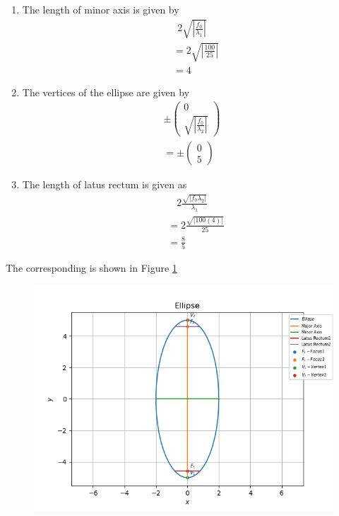 \documentclass[12pt]{article}
\providecommand{\brak}[1]{\ensuremath{\left(#1\right)}}
\providecommand{\abs}[1]{\left\vert#1\right\vert}
\newcommand{\myvec}[1]{\ensuremath{\begin{pmatrix}#1\end{pmatrix}}}
\begin{document}
\begin{enumerate}
\item The length of minor axis is given by
\begin{align}
	 2\sqrt{\abs{\frac{f_0}{\lambda_1}}}
\end{align}
\begin{align}
	&= 2\sqrt{\abs{\frac{100}{25}}}\\
	&= 4
\end{align}
\item The vertices of the ellipse are given by
\begin{align}
	 \pm \myvec{0\\\sqrt{\abs{\frac{f_0}{\lambda_2}}}}\\
	= \pm \myvec{0\\5}
\end{align}
\item The length of latus rectum is given as
\begin{align}
	 2\frac{\sqrt{\abs{f_0 \lambda_2}}}{\lambda_1}
\end{align}
\begin{align}
	&= 2\frac{\sqrt{\abs{100\brak{4}}}}{25}\\
	&= \frac{8}{5}
\end{align}
\end{enumerate}
The corresponding is shown in Figure \ref{fig:Fig1}
\begin{figure}[!h]
	\begin{center} 
	    \includegraphics[width=\columnwidth]{figs/ellipse}
	\end{center}
\caption{}
\label{fig:Fig1}
\end{figure}
\end{document}
